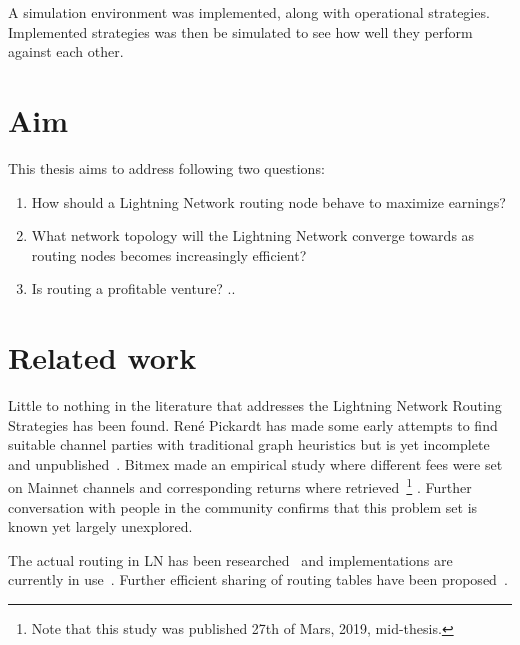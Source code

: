A simulation environment was implemented, along with operational strategies. Implemented strategies was then be simulated to see how well they perform against each other.

\section{Aim}
    \label{sec:aim}

This thesis aims to address following two questions:

	\begin{enumerate}
		\item How should a \gls{Lightning Network} routing node behave to maximize earnings?
	
		\item What network topology will the \gls{Lightning Network} converge towards as routing nodes becomes increasingly efficient?
		
		\item Is routing a profitable venture? ..
		
	\end{enumerate}
	
\section{Related work}
    \label{sec:related_work}

	Little to nothing in the literature that addresses the Lightning Network Routing Strategies has been found. René Pickardt has made some early attempts to find suitable channel parties with traditional graph heuristics but is yet incomplete and unpublished~\cite{repository:rene:pickard}. Bitmex made an empirical study where different fees were set on Mainnet channels and corresponding returns where retrieved~\cite{bitmex:fee}\footnote{Note that this study was published 27th of Mars, 2019, mid-thesis.} . Further conversation with people in the community confirms that this problem set is known yet largely unexplored.
	
	The actual routing in LN has been researched~\cite{distasi:avallone:cononico:routing} and implementations are currently in use~\cite{repository:clightning, repository:lnd, repository:eclair, repository:lit}. Further efficient sharing of routing tables have been proposed~\cite{gunspan:marco:ant}.
	
